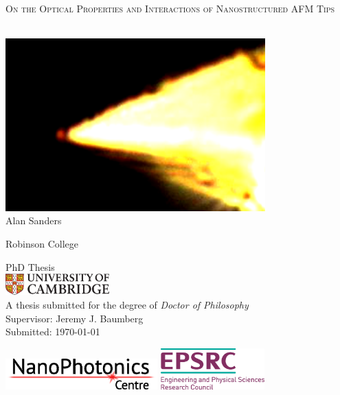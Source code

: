 \documentclass{book}
\begin{document}
\begin{titlepage}
    \centering
    ~\\[1.cm]
    \fontsize{20pt}{2.em}\selectfont
    \textsc{On the Optical Properties and Interactions of Nanostructured AFM Tips} \par ~\\
    \includegraphics[width=10cm]{title_image} \\
    \fontsize{14pt}{1em}\selectfont Alan Sanders \par
    \fontsize{12pt}{1em}\selectfont Robinson College \par
    PhD Thesis \\[0.5cm]
    \includegraphics[trim=0 0 270 0, clip, width=4cm]{uc-pantone} \\[0.5cm]
    A thesis submitted for the degree of \emph{Doctor of Philosophy} \\
    Supervisor: Jeremy J. Baumberg \\
    Submitted: \today \par
    \vfill
    \flushleft
    \includegraphics[height=1.2cm]{np_logo_2}
    \hfill
    \includegraphics[height=1.6cm]{sponsor}
\end{titlepage}
\end{document}

